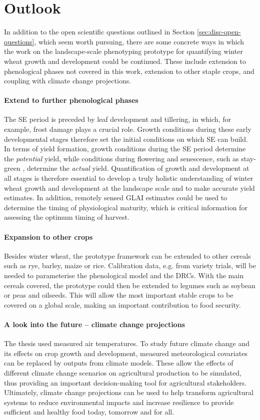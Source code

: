 \section{Outlook}
In addition to the open scientific questions outlined in Section \ref{sec:disc-open-questions}, which seem worth pursuing, there are some concrete ways in which the work on the landscape-scale phenotyping prototype for quantifying winter wheat growth and development could be continued. These include extension to phenological phases not covered in this work, extension to other staple crops, and coupling with climate change projections.

\paragraph{Extend to further phenological phases}
The \gls{SE} period is preceded by leaf development and tillering, in which, for example, frost damage \citep{tschurr_frost_2023} plays a crucial role. Growth conditions during these early developmental stages therefore set the initial conditions on which \gls{SE} can build. In terms of yield formation, growth conditions during the \gls{SE} period determine the \textsl{potential} yield, while conditions during flowering and senescence, such as stay-green \citep{thomas_stay-green_2014}, determine the \textsl{actual} yield. Quantification of growth and development at all stages is therefore essential to develop a truly holistic understanding of winter wheat growth and development at the landscape scale and to make accurate yield estimates. In addition, remotely sensed \gls{GLAI} estimates could be used to determine the timing of physiological maturity, which is critical information for assessing the optimum timing of harvest.

\paragraph{Expansion to other crops}
Besides winter wheat, the prototype framework can be extended to other cereals such as rye, barley, maize or rice. Calibration data, e.g. from variety trials, will be needed to parameterise the phenological model and the \gls{DRC}s. With the main cereals covered, the prototype could then be extended to legumes such as soybean or peas and oilseeds. This will allow the most important stable crops to be covered on a global scale, making an important contribution to food security.

\paragraph{A look into the future -- climate change projections}
The thesis used measured air temperatures. To study future climate change and its effects on crop growth and development, measured meteorological covariates can be replaced by outputs from climate models. These allow the effects of different climate change scenarios on agricultural production to be simulated, thus providing an important decision-making tool for agricultural stakeholders. Ultimately, climate change projections can be used to help transform agricultural systems to reduce environmental impacts and increase resilience to provide sufficient and healthy food today, tomorrow and for all.
